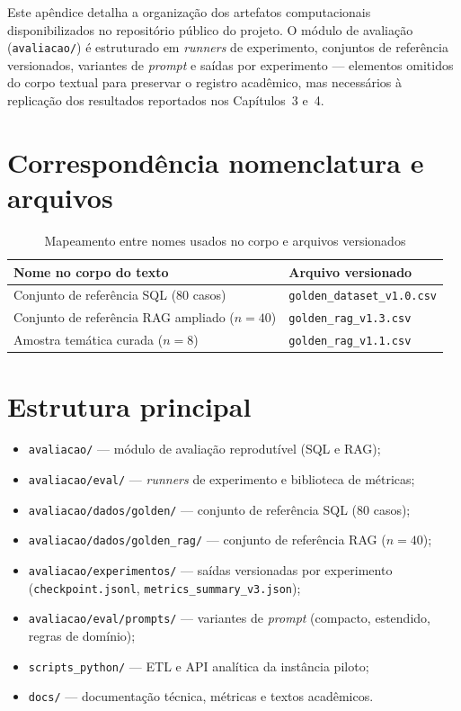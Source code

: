 \label{ap:artefatos}

Este apêndice detalha a organização dos artefatos computacionais disponibilizados no repositório público do projeto. O módulo de avaliação (\texttt{avaliacao/}) é estruturado em \textit{runners} de experimento, conjuntos de referência versionados, variantes de \textit{prompt} e saídas por experimento --- elementos omitidos do corpo textual para preservar o registro acadêmico, mas necessários à replicação dos resultados reportados nos Capítulos~3 e~4.

\section{Correspondência nomenclatura e arquivos}

\begin{table}[htbp]
\centering
\caption{Mapeamento entre nomes usados no corpo e arquivos versionados}
\label{tab:map_artefatos}
\small
\begin{tabular}{p{6.5cm}p{6.5cm}}
\toprule
\textbf{Nome no corpo do texto} & \textbf{Arquivo versionado} \\
\midrule
Conjunto de referência SQL (80 casos) & \texttt{golden\_dataset\_v1.0.csv} \\
Conjunto de referência RAG ampliado ($n=40$) & \texttt{golden\_rag\_v1.3.csv} \\
Amostra temática curada ($n=8$) & \texttt{golden\_rag\_v1.1.csv} \\
\bottomrule
\end{tabular}
\end{table}

\section{Estrutura principal}

\begin{itemize}
    \item \texttt{avaliacao/} --- módulo de avaliação reprodutível (SQL e RAG);
    \item \texttt{avaliacao/eval/} --- \textit{runners} de experimento e biblioteca de métricas;
    \item \texttt{avaliacao/dados/golden/} --- conjunto de referência SQL (80 casos);
    \item \texttt{avaliacao/dados/golden\_rag/} --- conjunto de referência RAG ($n=40$);
    \item \texttt{avaliacao/experimentos/} --- saídas versionadas por experimento (\texttt{checkpoint.jsonl}, \texttt{metrics\_summary\_v3.json});
    \item \texttt{avaliacao/eval/prompts/} --- variantes de \textit{prompt} (compacto, estendido, regras de domínio);
    \item \texttt{scripts\_python/} --- ETL e API analítica da instância piloto;
    \item \texttt{docs/} --- documentação técnica, métricas e textos acadêmicos.
\end{itemize}

